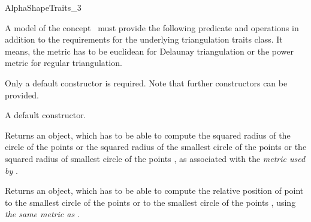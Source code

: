 \begin{ccRefConcept} {AlphaShapeTraits_3}


\ccDefinition
A model of the concept \ccRefName\  must provide the following predicate and
operations in addition to the requirements for the underlying triangulation
traits class.
It means, the metric has to be euclidean for Delaunay triangulation or the power 
metric for regular triangulation.

\ccRefines
{}

\ccTypes


\ccCreation

Only a default constructor is required. Note that further constructors
can be provided. 

{A default constructor.}


{Returns an object, which has to be able to compute the squared radius of the
circle of the points  or the squared radius of the
smallest circle of the points  or the squared radius of smallest circle
of the points , as  associated with the {\em metric
used by }.} 


{Returns an object, which has to be able to compute the relative position of
point  to the smallest circle of the points  or 
to the smallest circle of the points , using {\em the same metric as
}.} 

\end{ccRefConcept}
